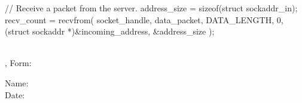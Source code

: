 \documentclass[12pt]{examdesign}
\begin{document}
\begin{lrbox}{\udpQuestion}%
\begin{minipage}{0.9\textwidth}
\begin{codelisting}
// Receive a packet from the server.
address_size = sizeof(struct sockaddr_in);
recv_count = recvfrom(
  socket_handle,
  data_packet,
  DATA_LENGTH,
  0,
  (struct sockaddr *)&incoming_address,
  &address_size
);
\end{codelisting}%
\end{minipage}%
\end{lrbox}


\begin{examtop}
  \parbox{3in}{\classdata \\
               \examtype, Form: }
  \hfill
  \parbox{3in}{\normalsize Name: \hrulefill \\[2.0ex]
                           Date: \hrulefill }
  \bigskip
\end{examtop}
\end{document}
